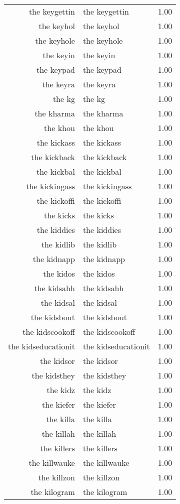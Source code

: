 \begin{table}[ht]
\begin{tabular}{rlr}
  the keygettin & the keygettin & 1.00 \\ 
  the keyhol & the keyhol & 1.00 \\ 
  the keyhole & the keyhole & 1.00 \\ 
  the keyin & the keyin & 1.00 \\ 
  the keypad & the keypad & 1.00 \\ 
  the keyra & the keyra & 1.00 \\ 
  the kg & the kg & 1.00 \\ 
  the kharma & the kharma & 1.00 \\ 
  the khou & the khou & 1.00 \\ 
  the kickass & the kickass & 1.00 \\ 
  the kickback & the kickback & 1.00 \\ 
  the kickbal & the kickbal & 1.00 \\ 
  the kickingass & the kickingass & 1.00 \\ 
  the kickoffi & the kickoffi & 1.00 \\ 
  the kicks & the kicks & 1.00 \\ 
  the kiddies & the kiddies & 1.00 \\ 
  the kidlib & the kidlib & 1.00 \\ 
  the kidnapp & the kidnapp & 1.00 \\ 
  the kidos & the kidos & 1.00 \\ 
  the kidsahh & the kidsahh & 1.00 \\ 
  the kidsal & the kidsal & 1.00 \\ 
  the kidsbout & the kidsbout & 1.00 \\ 
  the kidscookoff & the kidscookoff & 1.00 \\ 
  the kidseducationit & the kidseducationit & 1.00 \\ 
  the kidsor & the kidsor & 1.00 \\ 
  the kidsthey & the kidsthey & 1.00 \\ 
  the kidz & the kidz & 1.00 \\ 
  the kiefer & the kiefer & 1.00 \\ 
  the killa & the killa & 1.00 \\ 
  the killah & the killah & 1.00 \\ 
  the killers & the killers & 1.00 \\ 
  the killwauke & the killwauke & 1.00 \\ 
  the killzon & the killzon & 1.00 \\ 
  the kilogram & the kilogram & 1.00 \\ 

\end{tabular}
\end{table}
